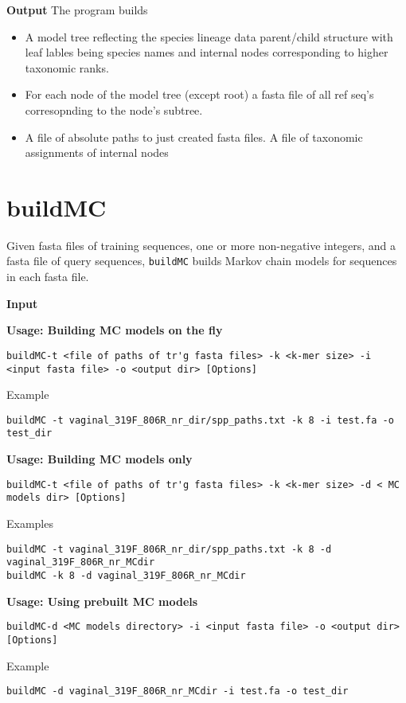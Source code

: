 \documentclass{article}
\newcommand{\<}{\ensuremath{<}}
\renewcommand{\>}{\ensuremath{>}}
\begin{document}
\vspace{5pt}
\noindent\textbf{Output} The program builds
\tightlists
\begin{itemize}
\item A model tree reflecting the species lineage data parent/child structure
  with leaf lables being species names and internal nodes corresponding to
  higher taxonomic ranks.
\item For each node of the model tree (except root) a fasta file of all ref seq's
   corresopnding to the node's subtree.
\item A file of absolute paths to just created fasta files. A file of taxonomic
   assignments of internal nodes
\end{itemize}

\section*{buildMC}

Given fasta files of training sequences, one or more non-negative integers, and
a fasta file of query sequences, \verb+buildMC+ builds Markov chain models for
sequences in each fasta file.

\textbf{Input}

\vspace{7pt}
\textbf{Usage: Building MC models on the fly}
\begin{verbatim}
buildMC-t <file of paths of tr'g fasta files> -k <k-mer size> -i <input fasta file> -o <output dir> [Options]
\end{verbatim}
Example
\begin{verbatim}
buildMC -t vaginal_319F_806R_nr_dir/spp_paths.txt -k 8 -i test.fa -o test_dir
\end{verbatim}

\textbf{Usage: Building MC models only}
\begin{verbatim}
buildMC-t <file of paths of tr'g fasta files> -k <k-mer size> -d < MC models dir> [Options]
\end{verbatim}
Examples
\begin{verbatim}
buildMC -t vaginal_319F_806R_nr_dir/spp_paths.txt -k 8 -d vaginal_319F_806R_nr_MCdir
buildMC -k 8 -d vaginal_319F_806R_nr_MCdir
\end{verbatim}

\textbf{Usage: Using prebuilt MC models}
\begin{verbatim}
buildMC-d <MC models directory> -i <input fasta file> -o <output dir> [Options]
\end{verbatim}
Example
\begin{verbatim}
buildMC -d vaginal_319F_806R_nr_MCdir -i test.fa -o test_dir
\end{verbatim}
\end{document}
